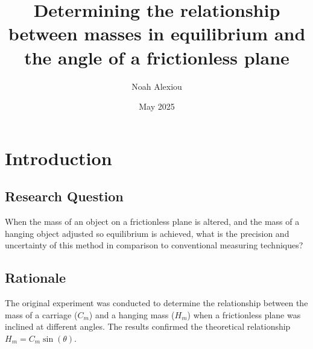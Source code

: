 \documentclass[11pt,a4paper]{article}
\begin{document}
\nocite{*}

\begin{titlepage}


\title{Determining the relationship between masses in equilibrium and the angle of a frictionless plane}

\author{Noah Alexiou}


\date{May 2025}

\maketitle
\centering

\end{titlepage}
\tableofcontents
\newpage

\section{Introduction}

\subsection{Research Question}
When the mass of an object on a frictionless plane is altered, and the mass of a hanging object adjusted so equilibrium is achieved, what is the precision and uncertainty of this method in comparison to conventional measuring techniques? 

\subsection{Rationale}

The original experiment was conducted to determine the relationship between the mass of a carriage ($C_m$) and a hanging mass ($H_m$) when a frictionless plane was inclined at different angles. The results confirmed the theoretical relationship $H_m = C_m \sin(\theta)$.
\end{document}
